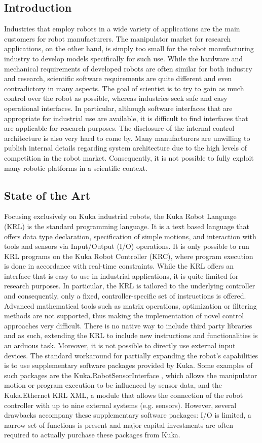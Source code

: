 \subsection{Introduction}
Industries that employ robots in a wide variety of applications are the main customers for robot manufacturers. The manipulator market for research applications, on the other hand, is simply too small for the robot manufacturing industry to develop models specifically for such use. 
While the hardware and mechanical requirements of developed robots are often similar for both industry and research, scientific software requirements are quite different and even contradictory in many aspects. The goal of scientist is to try to gain as much control over the robot as possible, whereas industries seek safe and easy operational interfaces.
In particular, although software interfaces that are appropriate for industrial use are available, it is difficult to find interfaces that are applicable for research purposes. The disclosure of the internal control architecture is also very hard to come by. Many manufacturers are unwilling to publish internal details regarding system architecture due to the high levels of competition in the robot market. Consequently, it is not possible to fully exploit many robotic platforms in a scientific context.

\subsection{State of the Art }
Focusing exclusively on Kuka industrial robots, the Kuka Robot Language (KRL) is the standard programming language. It is a text based language that offers data type declaration,  specification of simple motions, and interaction with tools and sensors via Input/Output (I/O) operations. It is only possible to run KRL programs on the Kuka Robot Controller (KRC), where program execution is done in accordance with real-time constraints. 
While the KRL offers an interface that is easy to use in industrial applications, it is quite limited for research purposes. In particular, the KRL is tailored to the underlying controller and consequently, only a fixed, controller-specific set of instructions is offered. Advanced mathematical tools such as matrix operations, optimization or filtering methods are not supported, thus making the implementation of novel control approaches very difficult. There is no native way to include third party libraries and as such, extending the KRL to include new instructions and functionalities is an arduous task. Moreover, it is not possible to directly use external input devices. 
The standard workaround for partially expanding the robot’s capabilities is to use supplementary software packages provided by Kuka. Some examples of such packages are the Kuka.RobotSensorInterface , which allows the manipulator motion or program execution to be influenced by sensor data, and the Kuka.Ethernet KRL XML, a module that allows the connection of the robot controller with up to nine external systems (e.g. sensors). However, several drawbacks accompany these supplementary software packages: I/O is limited, a narrow set of functions is present and major capital investments are often required to actually purchase these packages from Kuka.


